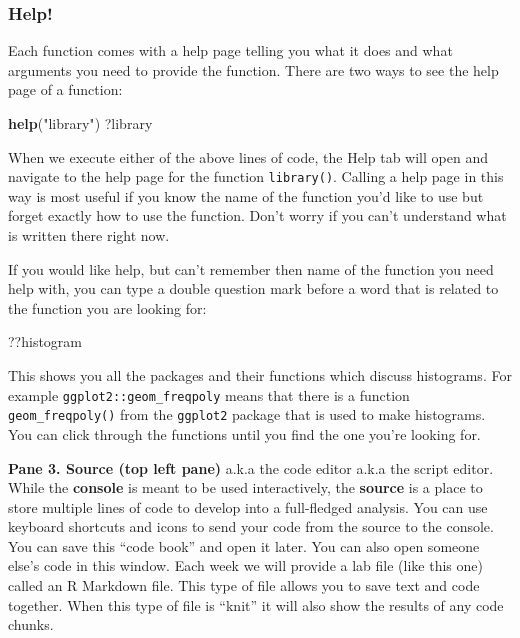 \documentclass[
]{article}
\newenvironment{Shaded}{\begin{snugshade}}{\end{snugshade}}
\newcommand{\FunctionTok}[1]{\textcolor[rgb]{0.13,0.29,0.53}{\textbf{#1}}}
\newcommand{\NormalTok}[1]{#1}
\newcommand{\StringTok}[1]{\textcolor[rgb]{0.31,0.60,0.02}{#1}}
\begin{document}
\subsubsection{Help!}\label{help}

Each function comes with a help page telling you what it does and what
arguments you need to provide the function. There are two ways to see
the help page of a function:

\begin{Shaded}
\begin{Highlighting}[]
\FunctionTok{help}\NormalTok{(}\StringTok{"library"}\NormalTok{)}
\NormalTok{?library}
\end{Highlighting}
\end{Shaded}

When we execute either of the above lines of code, the Help tab will
open and navigate to the help page for the function \texttt{library()}.
Calling a help page in this way is most useful if you know the name of
the function you'd like to use but forget exactly how to use the
function. Don't worry if you can't understand what is written there
right now.

If you would like help, but can't remember then name of the function you
need help with, you can type a double question mark before a word that
is related to the function you are looking for:

\begin{Shaded}
\begin{Highlighting}[]
\NormalTok{??histogram}
\end{Highlighting}
\end{Shaded}

This shows you all the packages and their functions which discuss
histograms. For example \texttt{ggplot2::geom\_freqpoly} means that
there is a function \texttt{geom\_freqpoly()} from the \texttt{ggplot2}
package that is used to make histograms. You can click through the
functions until you find the one you're looking for.

\textbf{Pane 3. Source (top left pane)} a.k.a the code editor a.k.a the
script editor. While the \textbf{console} is meant to be used
interactively, the \textbf{source} is a place to store multiple lines of
code to develop into a full-fledged analysis. You can use keyboard
shortcuts and icons to send your code from the source to the console.
You can save this ``code book'' and open it later. You can also open
someone else's code in this window. Each week we will provide a lab file
(like this one) called an R Markdown file. This type of file allows you
to save text and code together. When this type of file is ``knit'' it
will also show the results of any code chunks.
\end{document}
